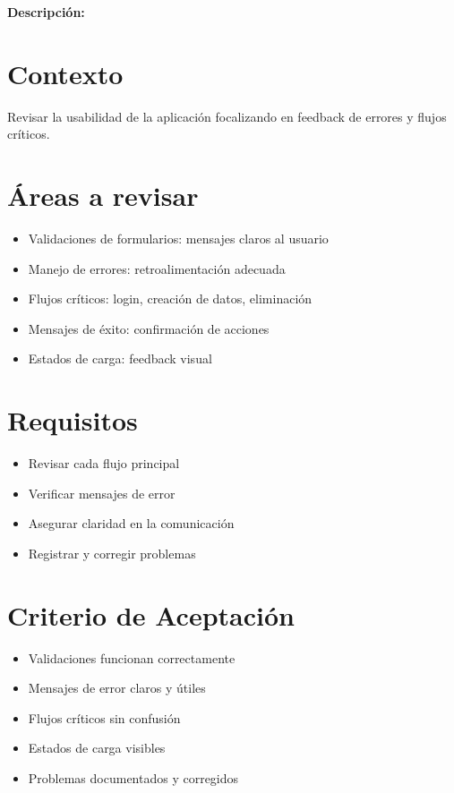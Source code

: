 \documentclass[
  spanish,
  11pt,
]{report}
\providecommand{\tightlist}{%
  \setlength{\itemsep}{0pt}\setlength{\parskip}{0pt}}
\begin{document}
\textbf{Descripción:}

\section{Contexto}\label{contexto-14}

Revisar la usabilidad de la aplicación focalizando en feedback de
errores y flujos críticos.

\section{Áreas a revisar}\label{uxe1reas-a-revisar}

\begin{itemize}
\tightlist
\item
  Validaciones de formularios: mensajes claros al usuario
\item
  Manejo de errores: retroalimentación adecuada
\item
  Flujos críticos: login, creación de datos, eliminación
\item
  Mensajes de éxito: confirmación de acciones
\item
  Estados de carga: feedback visual
\end{itemize}

\section{Requisitos}\label{requisitos-13}

\begin{itemize}
\tightlist
\item
  Revisar cada flujo principal
\item
  Verificar mensajes de error
\item
  Asegurar claridad en la comunicación
\item
  Registrar y corregir problemas
\end{itemize}

\section{Criterio de Aceptación}\label{criterio-de-aceptaciuxf3n-13}

\begin{itemize}
\tightlist
\item[$\square$]
  Validaciones funcionan correctamente
\item[$\square$]
  Mensajes de error claros y útiles
\item[$\square$]
  Flujos críticos sin confusión
\item[$\square$]
  Estados de carga visibles
\item[$\square$]
  Problemas documentados y corregidos
\end{itemize}
\end{document}
